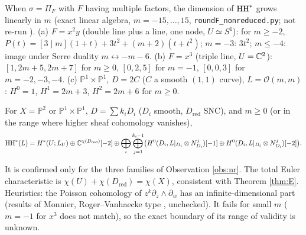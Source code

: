 \begin{obs}\label{obs:nr}
When $\sigma=\Pi_F$ with $F$ having multiple factors, the dimension of $\mathrm{HH}^*$ grows linearly in $m$ (exact linear algebra, $m=-15,\dots,15$, \texttt{roundF\_nonreduced.py}; not re-run \tQ). (a) $F=x^2y$ (double line plus a line, one node, $U\simeq S^1$): for $m\ge-2$, $P(t)=[3\mid m](1+t)+3t^2+(m+2)(t+t^2)$; $m=-3$: $3t^2$; $m\le-4$: image under Serre duality $m\leftrightarrow-m-6$. (b) $F=x^3$ (triple line, $U=\mathbb C^2$): $[1,2m+5,2m+7]$ for $m\ge0$, $[0,2,5]$ for $m=-1$, $[0,0,3]$ for $m=-2,-3,-4$. (c) $\mathbb P^1\times\mathbb P^1$, $D=2C$ ($C$ a smooth $(1,1)$ curve), $L=\mathcal O(m,m)$: $H^0=1$, $H^1=2m+3$, $H^2=2m+6$ for $m\ge0$.
\end{obs}
\begin{conj}\tK\label{conj:NR}
For $X=\mathbb P^2$ or $\mathbb P^1\times\mathbb P^1$, $D=\sum k_iD_i$ ($D_i$ smooth, $D_{\mathrm{red}}$ SNC), and $m\ge0$ (or in the range where higher sheaf cohomology vanishes),
\[\mathrm{HH}^*(L)=H^*(U;L_U)\oplus\mathbb C^{\chi(D_{\mathrm{red}})}[-2]\oplus\bigoplus_i\bigoplus_{j=1}^{k_i-1}\bigl(H^0(D_i,L|_{D_i}\otimes N_{D_i}^{j})[-1]\oplus H^0(D_i,L|_{D_i}\otimes N_{D_i}^{j})[-2]\bigr).\]
\end{conj}
\noindent It is confirmed only for the three families of Observation \ref{obs:nr}. The total Euler characteristic is $\chi(U)+\chi(D_{\mathrm{red}})=\chi(X)$, consistent with Theorem \ref{thm:E}. Heuristics: the Poisson cohomology of $z^k\partial_z\wedge\partial_w$ has an infinite-dimensional part (results of Monnier, Roger--Vanhaecke type \tC \tQ, unchecked). It fails for small $m$ ($m=-1$ for $x^3$ does not match), so the exact boundary of its range of validity is unknown.
